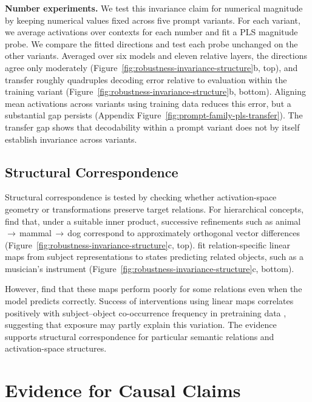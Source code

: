 \documentclass[11pt]{article}
\begin{document}
\textbf{Number experiments.} We test this invariance claim for numerical magnitude by keeping numerical values fixed across five prompt variants.
For each variant, we average activations over contexts for each number and fit a PLS magnitude probe.
We compare the fitted directions and test each probe unchanged on the other variants.
Averaged over six models and eleven relative layers, the directions agree only moderately (Figure~\ref{fig:robustness-invariance-structure}b, top), and transfer roughly quadruples decoding error relative to evaluation within the training variant (Figure~\ref{fig:robustness-invariance-structure}b, bottom).
Aligning mean activations across variants using training data reduces this error, but a substantial gap persists (Appendix Figure~\ref{fig:prompt-family-pls-transfer}).
The transfer gap shows that decodability within a prompt variant does not by itself establish invariance across variants.

\subsection{Structural Correspondence}

Structural correspondence is tested by checking whether activation-space geometry or transformations preserve target relations.
For hierarchical concepts, \citet{park2025geometry} find that, under a suitable inner product, successive refinements such as animal\,$\to$\,mammal\,$\to$\,dog correspond to approximately orthogonal vector differences (Figure~\ref{fig:robustness-invariance-structure}c, top).
\citet{hernandez2024linearity} fit relation-specific linear maps from subject representations to states predicting related objects, such as a musician's instrument (Figure~\ref{fig:robustness-invariance-structure}c, bottom).

However, \citet{hernandez2024linearity} find that these maps perform poorly for some relations even when the model predicts correctly.
Success of interventions using linear maps correlates positively with subject--object co-occurrence frequency in pretraining data \citep{merullo2025linear}, suggesting that exposure may partly explain this variation.
The evidence supports structural correspondence for particular semantic relations and activation-space structures.

\section{Evidence for Causal Claims}
\label{sec:empirical-evidence}
\end{document}

